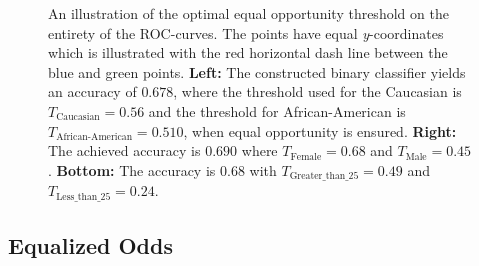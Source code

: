 \documentclass[11pt, fleqn, titlepage]{article}
\begin{document}
\begin{figure}[H]
\begin{center}
\begin{subfigure}{0.5\textwidth}
		\end{subfigure}
		\end{center}
		\caption{An illustration of the optimal equal opportunity threshold on the entirety of the ROC-curves. The points have equal \textit{y}-coordinates which is illustrated with the red horizontal dash line between the blue and green points. \textbf{Left:} The constructed binary classifier yields an accuracy of $ 0.678 $, where the threshold used for the Caucasian is $T_{\text{Caucasian}}= 0.56 $ and the threshold for African-American is $ T_{\text{African-American}}=0.510 $, when equal opportunity is ensured. \textbf{Right:} The achieved accuracy is $0.690$ where $T_{\text{Female}}= 0.68$ and $T_{\text{Male}}= 0.45$. \textbf{Bottom:} The accuracy is $0.68$ with $T_{\text{Greater\_than\_{25}}}= 0.49$ and $T_{\text{Less\_than\_{25}}}= 0.24$.}
		\label{fig:equal-opportunity-optimal}
	\end{figure}
	\vspace*{-0.3cm}
	\subsection{Equalized Odds}\label{equalizedOdds}
	
\end{document}
